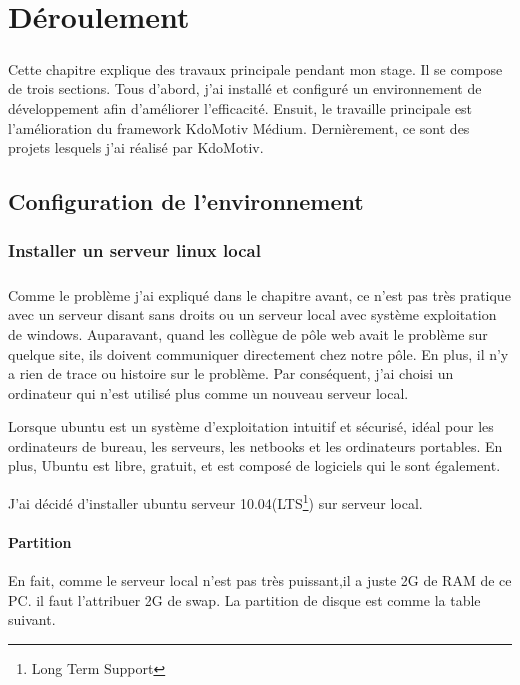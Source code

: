 \chapter{Déroulement}\thispagestyle{fancy}

\paragraph{}
Cette chapitre explique des travaux principale pendant mon stage. Il se compose de trois sections. Tous d'abord, j'ai installé et configuré un environnement de développement afin d'améliorer l'efficacité. Ensuit, le travaille principale est l'amélioration du framework KdoMotiv Médium. Dernièrement, ce sont des projets lesquels j'ai réalisé par KdoMotiv.

\section[Configuration]{Configuration de l'environnement}

\subsection{Installer un serveur linux local}
\paragraph{}
Comme le problème j'ai expliqué dans le chapitre avant, ce n'est pas très pratique avec un serveur disant sans droits ou un serveur local avec système exploitation de windows.
Auparavant, quand les collègue de pôle web avait le problème sur quelque site, ils doivent communiquer directement chez notre pôle. En plus, il n'y a rien de trace ou histoire sur le problème. 
Par conséquent, j'ai choisi un ordinateur qui n'est utilisé plus comme un nouveau serveur local. 

Lorsque ubuntu est un système d'exploitation intuitif et sécurisé, idéal pour les ordinateurs de bureau, les serveurs, les netbooks et les ordinateurs portables. En plus, Ubuntu est libre, gratuit, et est composé de logiciels qui le sont également.

J'ai décidé d'installer ubuntu serveur 10.04(LTS\footnote{Long Term Support}) sur serveur local.

\subsubsection{Partition}
En fait, comme le serveur local n'est pas très puissant,il a juste 2G de RAM de ce PC.  il faut l'attribuer 2G de swap. La partition de disque est comme la table suivant.

